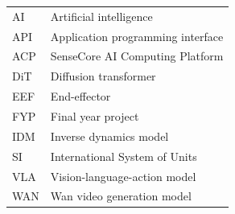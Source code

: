 
\begin{tabular}{@{}p{3cm}p{10cm}@{}}
AI & Artificial intelligence \\
API & Application programming interface \\
ACP & SenseCore AI Computing Platform \\
DiT & Diffusion transformer \\
EEF & End-effector \\
FYP & Final year project \\
IDM & Inverse dynamics model \\
SI & International System of Units \\
VLA & Vision-language-action model \\
WAN & Wan video generation model \\
\end{tabular}
